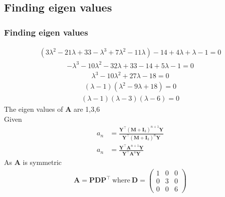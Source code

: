 \documentclass{beamer}
\providecommand{\brak}[1]{\ensuremath{\left(#1\right)}}
\theoremstyle{remark}
\newcommand{\myvec}[1]{\ensuremath{\begin{pmatrix}#1\end{pmatrix}}}
\let\vec\mathbf
\numberwithin{equation}{section}
\begin{document}
\begin{frame}
\subsection{Finding eigen values}
\frametitle{Finding eigen values}
 \vspace{-0.7cm} 
 \begin{align}
 \brak{3\lambda^2-21\lambda+33-\lambda^3+7\lambda^2-11\lambda}-14+4\lambda+\lambda-1=0
 \end{align}
 \vspace{-0.7cm}
 \begin{align}
 -\lambda^3-10\lambda^2-32\lambda+33-14+5\lambda-1=0 
 \end{align}
 \vspace{-0.7cm}
 \begin{align}
 \lambda^3-10\lambda^2+27\lambda-18=0 
\end{align}
\vspace{-0.7cm}
\begin{align}
    \brak{\lambda-1}\brak{\lambda^2-9\lambda+18}=0
\end{align}
\vspace{-0.7cm}
\begin{align}
    \brak{\lambda-1}\brak{\lambda-3}\brak{\lambda-6}=0
\end{align}
The eigen values of $\vec{A}$ are 1,3,6 \\
Given
\begin{align}
a_n&=\frac{\vec{Y}^\top\brak{\vec{M}+\vec{I}_3}^{n+1}\vec{Y}}{\vec{Y}^\top\brak{\vec{M}+\vec{I}_3}^{n}\vec{Y}} \\
    a_n&=\frac{\vec{Y}^\top\vec{A}^{n+1}\vec{Y}}{\vec{Y}^\top\vec{A}^{n}\vec{Y}}
\end{align}
As $\vec{A}$ is symmetric
\begin{align}
    \vec{A}=\vec{P}\vec{D}\vec{P}^\top\ \text{where}\ \vec{D}=\myvec{1&0&0\\0&3&0\\0&0&6} 
    \end{align}
\end{frame}
\end{document}
